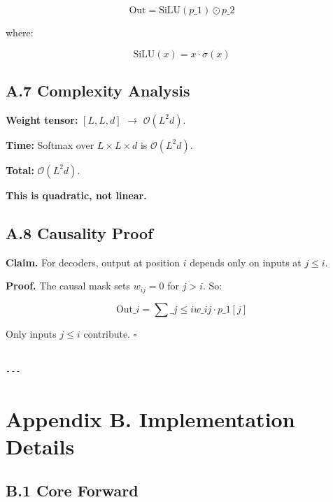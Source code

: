 \[
\text{Out} = \text{SiLU}(p\_1) \odot p\_2
\tag{A.10}
\]

where:

\[
\text{SiLU}(x) = x \cdot \sigma(x)
\tag{A.11}
\]

\subsection{A.7 Complexity Analysis}

\textbf{Weight tensor:} $[L, L, d]$ $\to$ $\mathcal{O}(L^2 d)$.

\textbf{Time:} Softmax over $L \times L \times d$ is $\mathcal{O}(L^2 d)$.

\textbf{Total:} $\mathcal{O}(L^2 d)$.

\textbf{This is quadratic, not linear.}

\subsection{A.8 Causality Proof}

\textbf{Claim.} For decoders, output at position $i$ depends only on inputs at 
$j \leq i$.

\textbf{Proof.} The causal mask sets $w_{ij} = 0$ for $j > i$. So:

\[
\text{Out}\_i = \sum\_{j \leq i} w\_{ij} \cdot p\_1[j]
\tag{A.12}
\]

Only inputs $j \leq i$ contribute. $\square$
\begin{lstlisting}

---
\end{lstlisting}

\section{Appendix B. Implementation Details}

\subsection{B.1 Core Forward}

